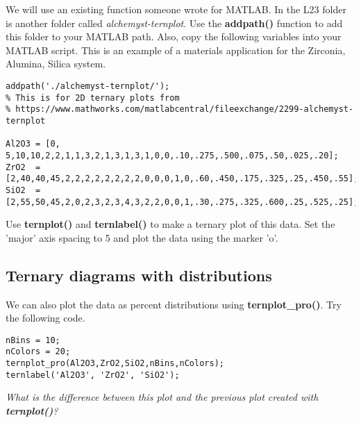 \documentclass[10pt,fleqn]{article}
\begin{document}
We will use an existing function someone wrote for MATLAB. In the L23 folder is another folder called \textit{alchemyst-ternplot}. Use the \textbf{addpath()} function to add this folder to your MATLAB path. Also, copy the following variables into your MATLAB script. This is an example of a materials application for the Zirconia, Alumina, Silica system.

\begin{lstlisting}
addpath('./alchemyst-ternplot/');
% This is for 2D ternary plots from 
% https://www.mathworks.com/matlabcentral/fileexchange/2299-alchemyst-ternplot

Al2O3 = [0, 5,10,10,2,2,1,1,3,2,1,3,1,3,1,0,0,.10,.275,.500,.075,.50,.025,.20];
ZrO2  = [2,40,40,45,2,2,2,2,2,2,2,2,0,0,0,1,0,.60,.450,.175,.325,.25,.450,.55];
SiO2  = [2,55,50,45,2,0,2,3,2,3,4,3,2,2,0,0,1,.30,.275,.325,.600,.25,.525,.25];
\end{lstlisting}

Use \textbf{ternplot()} and \textbf{ternlabel()} to make a ternary plot of this data. Set the 'major' axis spacing to 5 and plot the data using the marker 'o'.

\subsection*{Ternary diagrams with distributions}

We can also plot the data as percent distributions using \textbf{ternplot\_pro()}. Try the following code.

\begin{lstlisting}
nBins = 10;
nColors = 20;
ternplot_pro(Al2O3,ZrO2,SiO2,nBins,nColors);
ternlabel('Al2O3', 'ZrO2', 'SiO2');
\end{lstlisting}

\textit{What is the difference between this plot and the previous plot created with \textbf{ternplot()}?}
\end{document}
